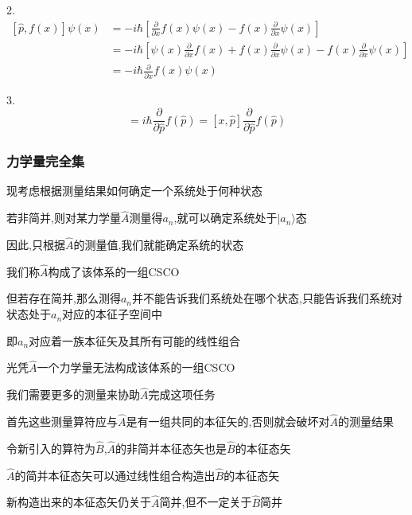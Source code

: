 \documentclass[lang=cn,10pt]{elegantbook}
\begin{document}
2.\begin{equation*}
	\begin{split}
		[\hat{p},f(x)]\psi \left( x \right) &=-i\hbar \left[ \frac{\partial}{\partial x}f\left( x \right) \psi \left( x \right) -f\left( x \right) \frac{\partial}{\partial x}\psi \left( x \right) \right] 
		\\
		&=-i\hbar \left[ \psi \left( x \right) \frac{\partial}{\partial x}f\left( x \right) +f\left( x \right) \frac{\partial}{\partial x}\psi \left( x \right) -f\left( x \right) \frac{\partial}{\partial x}\psi \left( x \right) \right] 
		\\
		&=-i\hbar \frac{\partial}{\partial x}f\left( x \right) \psi \left( x \right)
	\end{split}
\end{equation*}

3.\begin{equation*}
	[x,f(\hat{p})]=i\hbar \frac{\partial}{\partial \hat{p}}f\left( \hat{p} \right) =\left[ x,\hat{p} \right] \frac{\partial}{\partial \hat{p}}f\left( \hat{p} \right) 
\end{equation*}
\subsubsection{力学量完全集}

现考虑根据测量结果如何确定一个系统处于何种状态

若非简并,则对某力学量$\hat{A}$测量得$a_n$,就可以确定系统处于$|a_n\rangle$态

因此,只根据$\hat{A}$的测量值,我们就能确定系统的状态

我们称$\hat{A}$构成了该体系的一组CSCO

但若存在简并,那么测得$a_n$并不能告诉我们系统处在哪个状态,只能告诉我们系统对状态处于$a_n$对应的本征子空间中

即$a_n$对应着一族本征矢及其所有可能的线性组合

光凭$\hat{A}$一个力学量无法构成该体系的一组CSCO

我们需要更多的测量来协助$\hat{A}$完成这项任务

首先这些测量算符应与$\hat{A}$是有一组共同的本征矢的,否则就会破坏对$\hat{A}$的测量结果

令新引入的算符为$\hat{B}$,$\hat{A}$的非简并本征态矢也是$\hat{B}$的本征态矢

	$\hat{A}$的简并本征态矢可以通过线性组合构造出$\hat{B}$的本征态矢

新构造出来的本征态矢仍关于$\hat{A}$简并,但不一定关于$\hat{B}$简并
\end{document}
